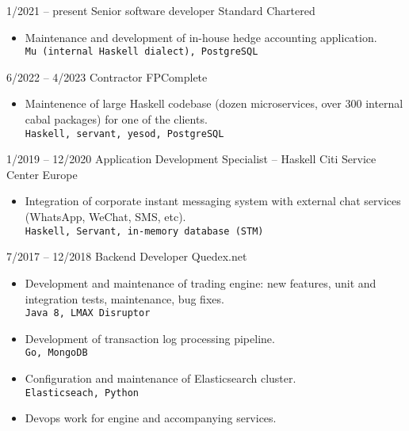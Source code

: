 \documentclass[8pt]{developercv} %
\begin{document}
\begin{entrylist}
	\entry
		{1/2021 -- present}
		{Senior software developer}
		{Standard Chartered}
		{\begin{itemize}
                  \item Maintenance and development of in-house hedge accounting
                    application.\\
                    \texttt{Mu (internal Haskell dialect), PostgreSQL}
                  \end{itemize}
                }
	\entry
		{6/2022 -- 4/2023}
		{Contractor}
		{FPComplete}
		{\begin{itemize}
                  \item Maintenence of large Haskell codebase (dozen microservices, over 300 internal cabal packages) for one of the clients.\\
                    \texttt{Haskell, servant, yesod, PostgreSQL}
                  \end{itemize}
                }                
	\entry
		{1/2019 -- 12/2020}
		{Application Development Specialist -- Haskell}
		{Citi Service Center Europe}
		{\begin{itemize}
                  \item Integration of corporate instant messaging system
                    with external chat services (WhatsApp, WeChat, SMS, etc).\\
                    \texttt{Haskell, Servant, in-memory database (STM)}
                  \end{itemize}
                }
	\entry
		{7/2017 -- 12/2018}
		{Backend Developer}
		{Quedex.net}
		{\begin{itemize}
                  \item Development and maintenance of trading engine:
                    new features, unit and integration tests, maintenance,
                    bug fixes.\\
                    \texttt{Java 8, LMAX Disruptor}
                  \item Development of transaction log processing pipeline.\\
                    \texttt{Go, MongoDB}
                  \item Configuration and maintenance of Elasticsearch cluster.\\
                    \texttt{Elasticseach, Python}
                  \item Devops work for engine and accompanying services.\\

\end{itemize}}
\end{entrylist}
\end{document}
